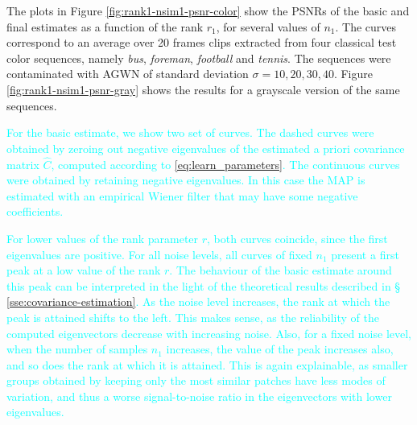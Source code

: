 \documentclass[10pt, journal, twocolumn, final, a4paper]{IEEEtran}
\newcommand{\pa}[1]{\textcolor{cyan}{#1}}
\newcommand{\prm}[1]{\pa{\sout{#1}}}
\newcommand{\padd}[1]{\pa{#1}}
\newcommand{\pcomment}[1]{}
\begin{document}



The plots in Figure \ref{fig:rank1-nsim1-psnr-color} show the PSNRs of the
basic and final estimates as a function of the rank $r_1$, for several values
of $n_{1}$. The curves correspond to an average over 20 frames clips extracted
from four classical test color sequences, namely \emph{bus}, \emph{foreman},
\emph{football} and
\emph{tennis}. The sequences were contaminated with
AGWN of standard deviation $\sigma = 10, 20, 30, 40$. 
Figure \ref{fig:rank1-nsim1-psnr-gray} shows the results for a
grayscale version of the same sequences. 
%
%

\padd{For the basic estimate, we show two set of curves. The dashed curves were
obtained by zeroing out negative eigenvalues of the estimated a priori covariance
matrix $\widehat C$, computed according to \eqref{eq:learn_parameters}. The continuous curves 
were obtained by retaining negative eigenvalues. In this case the MAP is estimated
with an empirical Wiener filter that may have some negative coefficients.}

\padd{For lower values of the rank parameter $r$, both curves coincide, since the first
eigenvalues are positive. 
For all noise levels, all curves of fixed $n_1$ present a first peak at a low value of the rank $r$.
The behaviour of the basic estimate around this peak can be
interpreted in the light of the theoretical results described in \S
\ref{sse:covariance-estimation}.
As the noise level increases, the rank at which the peak is attained
shifts to the left. This makes sense, as the reliability of the computed eigenvectors
decrease with increasing noise.
%
Also, for a fixed noise level, when the number of samples $n_1$ increases, the value
of the peak increases also, and so does the rank at which it is attained.
This is again explainable, as smaller groups obtained by keeping only the
most similar patches have less modes of variation, and thus a worse signal-to-noise ratio
in the eigenvectors with lower eigenvalues.}
\end{document}
